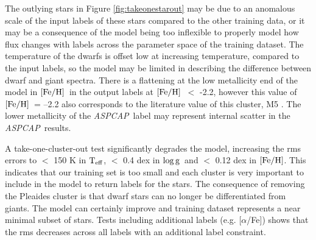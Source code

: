 \documentclass[12pt, preprint]{aastex}
\newcommand{\teff}{\mbox{$\rm T_{eff}$}}
\newcommand{\feh}{\mbox{$\rm [Fe/H]$}}
\newcommand{\logg}{\mbox{$\rm \log g$}}
\newcommand{\aspcap}{\textsl{ASPCAP}}
\begin{document}

The outlying stars in Figure \ref{fig:takeonestarout} may be due to an anomalous scale of the input labels of these stars compared to the other training data, or it may be a consequence of the model being too inflexible to properly model how flux changes with labels across the parameter space of the training dataset. 
The temperature of the dwarfs is offset low at increasing temperature, compared to the input labels, so the model may be limited in describing the difference between dwarf and giant spectra. 
There is a flattening at the low metallicity end of the model in \feh\ in the output labels at \feh\ $<$ -2.2, however this value of \feh\ = --2.2 also corresponds to the literature value of this cluster, M5 \citep{Meszaros2013}. 
The lower metallicity of the \aspcap\ label may represent internal scatter in the \aspcap\ results.

A take-one-cluster-out test significantly degrades the model, increasing the rms errors to $<$ 150 K in \teff, $<$ 0.4 dex in \logg\ and $<$ 0.12 dex in \feh. 
This indicates that our training set is too small and each cluster is very important to include in the model to return labels for the stars. 
The consequence of removing the Pleaides cluster is that dwarf stars can no longer be differentiated from giants.
 The model can certainly improve and training dataset represents a near minimal subset of stars. 
 Tests including additional labels (e.g. [$\alpha$/Fe]) shows that the rms decreases across all labels with an additional label constraint. 
\end{document}
